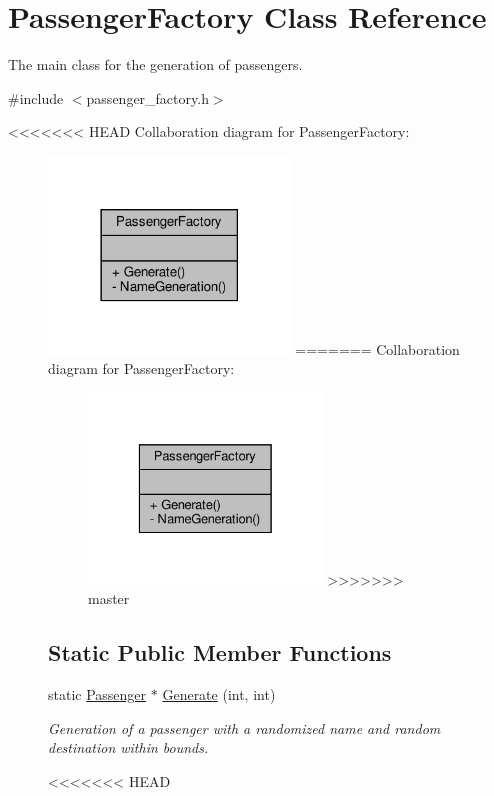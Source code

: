 \hypertarget{classPassengerFactory}{}\section{Passenger\+Factory Class Reference}
\label{classPassengerFactory}


The main class for the generation of passengers.  




{\ttfamily \#include $<$passenger\+\_\+factory.\+h$>$}



<<<<<<< HEAD
Collaboration diagram for Passenger\+Factory\+:\nopagebreak
\begin{figure}[H]
\begin{center}
\leavevmode
\includegraphics[width=182pt]{classPassengerFactory__coll__graph}
=======
Collaboration diagram for Passenger\+Factory\+:
\nopagebreak
\begin{figure}[H]
\begin{center}
\leavevmode
\includegraphics[width=176pt]{classPassengerFactory__coll__graph}
>>>>>>> master
\end{center}
\end{figure}
\subsection*{Static Public Member Functions}
\begin{DoxyCompactItemize}
\item 
static \hyperlink{classPassenger}{Passenger} $\ast$ \hyperlink{classPassengerFactory_a2952ba78ceb285f445bc768d287230d2}{Generate} (int, int)
\begin{DoxyCompactList}\small\item\em Generation of a passenger with a randomized name and random destination within bounds. \end{DoxyCompactList}\end{DoxyCompactItemize}
<<<<<<< HEAD

\end{center}
\end{figure}
